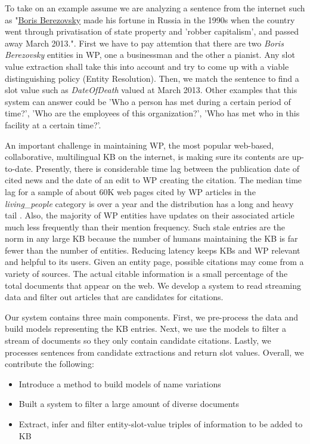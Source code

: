 To take on an example assume we are analyzing a sentence from the internet such as "\underline{Boris Berezovsky} made his fortune in Russia in the 1990s when the country went through privatisation of state property and 'robber capitalism', and passed away March 2013.". First we have to pay attemtion that there are two \textit{Boris Berezovsky} entities in WP, one a businessman and the other a pianist. Any slot value extraction shall take this into account and try to come up with a viable distinguishing policy (Entity Resolution). Then, we match the sentence to find a slot value such as \textit{DateOfDeath} valued at March 2013. Other examples that this system can answer could be 'Who a person has met during a certain period of time?', 'Who are the employees of this organization?', 'Who has met who in this facility at a certain time?'.

 An important challenge in maintaining WP, the most popular web-based, collaborative, multilingual KB on the internet, is making sure its contents are up-to-date. Presently, there is considerable time lag between the publication date of cited news and the date of an edit to WP creating the citation. The median time lag for a sample of about 60K web pages cited by WP articles in the \textit{living\_people} category is over a year and the distribution has a long and heavy tail \cite{JFrank12}. Also, the majority of WP entities have updates on their associated article much less frequently than their mention frequency. Such stale entries are the norm in any large KB because the number of humans maintaining the KB is far fewer than the number of entities. %
Reducing latency keeps KBs and WP relevant and helpful to its users. Given an entity page, possible citations may come from a variety of sources. The actual citable information is a small percentage of the total documents that appear on the web. We develop a system to read streaming data and filter out articles that are candidates for citations. 

Our system contains three main components. First, we pre-process the data and build models representing the KB entries. Next, we use the models to filter a stream of documents so they only contain candidate citations. Lastly, we processes sentences from candidate extractions and return slot values. 
Overall, we contribute the following:
\begin{itemize}[noitemsep,nolistsep]
\item Introduce a method to build models of name variations
\item Built a system to filter a large amount of diverse documents
\item Extract, infer and filter entity-slot-value triples of information to be added to KB 
\end{itemize}

